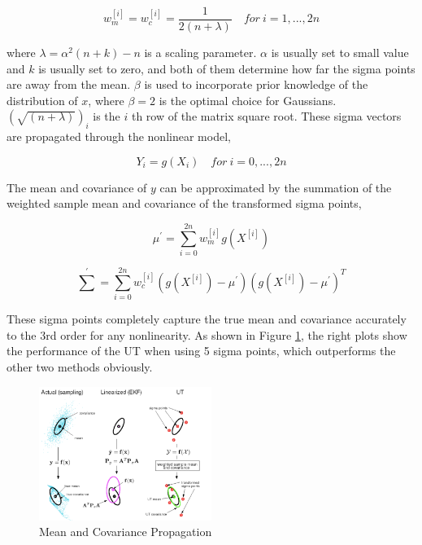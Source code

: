 \documentclass[10pt,twocolumn,letterpaper]{article}
\begin{document}
\begin{equation}
w_m^{[i]}=w_c^{[i]}=\frac{1}{2(n+\lambda)} \quad for \ i=1, ..., 2n
\end{equation}

where $\lambda=\alpha^2(n+k)-n$ is a scaling parameter. $\alpha$ is usually set to small value and $k$ is usually set to zero, and both of them determine how far the sigma points are away from the mean. $\beta$ is used to incorporate prior knowledge of the distribution of $x$, where $\beta=2$ is the optimal choice for Gaussians. $(\sqrt{(n+\lambda)})_i$ is the $i$ th row of the matrix square root. These sigma vectors are propagated through the nonlinear model,

\begin{equation}
Y_i=g(X_i) \quad for\  i=0, ..., 2n
\end{equation}

The mean and covariance of $y$ can be approximated by the summation of the weighted sample mean and covariance of the transformed sigma points,

\begin{equation}
\mu^{'}=\sum_{i=0}^{2n}w_m^{[i]}g(X^{[i]})
\end{equation}

\begin{equation}
\sum^{'}=\sum_{i=0}^{2n}w_c^{[i]}(g(X^{[i]})-\mu^{'})(g(X^{[i]})-\mu^{'})^T
\end{equation}

These sigma points completely capture the true mean and covariance accurately to the 3rd order for any nonlinearity. As shown in Figure \ref{fig: mean cov}\cite{ref:cyrill}, the right plots show the performance of the UT when using 5 sigma points, which outperforms the other two methods obviously.

\begin{figure}
     \centering
       \includegraphics[width=0.5\textwidth]{pic_3.png}
        \caption{\small{Mean and Covariance Propagation}}
        \label{fig: mean cov}
 \end{figure}
\end{document}
